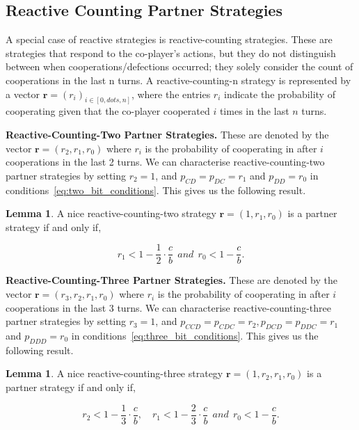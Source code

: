 \documentclass{article}
\theoremstyle{definition}
\newtheorem{lemma}[theorem]{Lemma}
\begin{document}
\subsection{Reactive Counting Partner Strategies}

A special case of reactive strategies is reactive-counting strategies. These are
strategies that respond to the co-player's actions, but they do not distinguish
between when cooperations/defections occurred; they solely consider the count of
cooperations in the last n turns. A reactive-counting-n strategy is represented
by a vector $\mathbf{r}=(r_i)_{i \in [0, dots, n]}$, where the entries \(r_i\)
indicate the probability of cooperating given that the co-player cooperated
\(i\) times in the last \(n\) turns.

{\bf Reactive-Counting-Two Partner Strategies.} These are denoted by the vector
$\mathbf{r}=(r_2, r_1, r_0)$ where $r_i$ is the probability of cooperating in
after $i$ cooperations in the last 2 turns. We can characterise reactive-counting-two
partner strategies by setting $r_2 = 1$, and $p_{CD} = p_{DC} = r_1$ and $p_{DD} = r_0$
in conditions~\eqref{eq:two_bit_conditions}. This gives us the following result.

\begin{lemma}
A nice reactive-counting-two strategy $\mathbf{r} = (1, r_1, r_0)$ is a partner strategy if and only if,

\begin{equation}\label{eq:counting_two_bit_conditions}
  \displaystyle r_1 < 1-\frac{1}{2} \cdot \frac{c}{b} ~~and~~ r_0 < 1\!-\! \frac{c}{b}.
\end{equation}
\end{lemma}

{\bf Reactive-Counting-Three Partner Strategies.} These are denoted by the vector
$\mathbf{r}=(r_3, r_2, r_1, r_0)$ where $r_i$ is the probability of cooperating in
after $i$ cooperations in the last 3 turns. We can characterise reactive-counting-three
partner strategies by setting $r_3 = 1$, and $p_{CCD} = p_{CDC} = r_2,
p_{DCD} = p_{DDC} = r_1$ and $p_{DDD} = r_0$
in conditions~\eqref{eq:three_bit_conditions}. This gives us the following result.

\begin{lemma}
A nice reactive-counting-three strategy $\mathbf{r} = (1, r_2, r_1, r_0)$ is a partner strategy if and only if,

\begin{equation}\label{eq:counting_three_bit_conditions}
  \displaystyle r_2 < 1- \frac{1}{3} \cdot \frac{c}{b}, \quad r_1 < 1- \frac{2}{3} \cdot \frac{c}{b} ~~and~~ r_0 < 1\!-\! \frac{c}{b}.
\end{equation}
\end{lemma}
\end{document}
